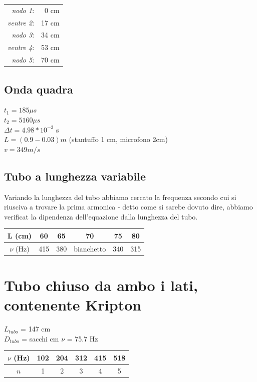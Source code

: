 \documentclass[a4paper,10pt]{report}
\begin{document}
\begin{center}
\begin{tabular}{r r}
\textit{nodo 1}: & 0 cm\\
\textit{ventre 2}: & 17 cm\\
\textit{nodo 3}: & 34 cm\\
\textit{ventre 4}: & 53 cm\\
\textit{nodo 5}: & 70 cm\\
\end{tabular}

\end{center}

\subsection{Onda quadra}
$t_1 = 185 \mu s $\\
$t_2 = 5160 \mu s $\\
$\Delta t = 4.98*10^{-3}$ s\\
$L = (0.9 - 0.03) m $ (stantuffo 1 cm, microfono 2cm)\\
$v = 349 m/s$

\subsection{Tubo a lunghezza variabile}
Variando la lunghezza del tubo abbiamo cercato la frequenza secondo cui si riusciva a trovare la prima armonica - detto come si sarebe dovuto dire, abbiamo verificat la dipendenza dell'equazione dalla lunghezza del tubo.

\begin{center}
\begin{tabular}{*{5}{c|}c}
L (cm) & 60 & 65 & 70 & 75 & 80 \\
\midrule
$\nu$ (Hz) & 415 & 380 & bianchetto & 340 & 315\\
\end{tabular}
\end{center}


\section{Tubo chiuso da ambo i lati, contenente Kripton}

$L_{tubo}$ = 147 cm\\
$D_{tubo}$ = sacchi cm
$\nu$ = 75.7 Hz
 


\begin{center}
\begin{tabular}{c|c|c|c|c|c}
$\nu$ (Hz) & 102 & 204 & 312 & 415 & 518 \\
\midrule
$n$ & 1 & 2 & 3 & 4 & 5\\
\end{tabular}
\end{center}
\end{document}
